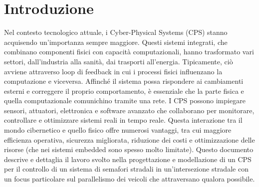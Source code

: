 \chapter*{Introduzione}
\label{cap:introduzione}

\rhead{\thepage}

Nel contesto tecnologico attuale, i Cyber-Physical Systems (CPS) stanno 
acquisendo un'importanza sempre maggiore. Questi sistemi integrati, che 
combinano componenti fisici con capacità computazionali, hanno trasformato 
vari settori, dall'industria alla sanità, dai trasporti all'energia. 
Tipicamente, ciò avviene attraverso loop di feedback in cui i processi 
fisici influenzano la computazione e viceversa. Affinché il sistema possa 
rispondere ai cambiamenti esterni e correggere il proprio comportamento, 
è essenziale che la parte fisica e quella computazionale comunichino 
tramite una rete. I CPS possono impiegare sensori, attuatori, elettronica 
e software avanzato che collaborano per monitorare, controllare e 
ottimizzare sistemi reali in tempo reale. Questa interazione tra il 
mondo cibernetico e quello fisico offre numerosi vantaggi, tra cui maggiore 
efficienza operativa, sicurezza migliorata, riduzione dei costi e 
ottimizzazione delle risorse (che nei sistemi embedded sono spesso molto 
limitate). Questo documento descrive e dettaglia il lavoro svolto nella 
progettazione e modellazione di un CPS per il controllo di un sistema 
di semafori stradali in un'intersezione stradale con un focus particolare
sul parallelismo dei veicoli che attraversano qualora possibile.